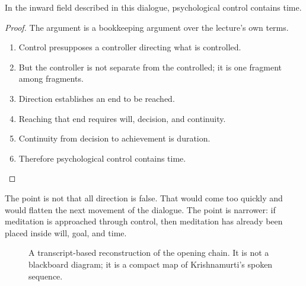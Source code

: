 \begin{proposition}
In the inward field described in this dialogue, psychological control contains time.
\end{proposition}

\begin{proof}
The argument is a bookkeeping argument over the lecture's own terms.
\begin{enumerate}
\item Control presupposes a controller directing what is controlled.
\item But the controller is not separate from the controlled; it is one fragment among fragments.
\item Direction establishes an end to be reached.
\item Reaching that end requires will, decision, and continuity.
\item Continuity from decision to achievement is duration.
\item Therefore psychological control contains time.
\end{enumerate}
\end{proof}

The point is not that all direction is false. That would come too quickly and would flatten the next movement of the dialogue. The point is narrower: if meditation is approached through control, then meditation has already been placed inside will, goal, and time.

\begin{figure}
\centering
{}
\caption{A transcript-based reconstruction of the opening chain. It is not a blackboard diagram; it is a compact map of Krishnamurti's spoken sequence.}
\end{figure}


